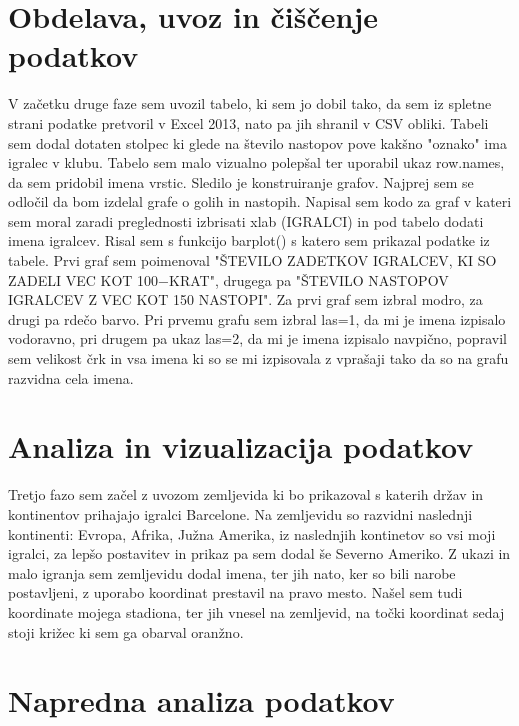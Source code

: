 \documentclass[11pt,a4paper]{article}
\begin{document}
\section{Obdelava, uvoz in čiščenje podatkov}
V začetku druge faze sem uvozil tabelo, ki sem jo dobil tako, da sem iz spletne strani podatke pretvoril v Excel 2013, nato pa jih shranil v CSV obliki. Tabeli sem dodal dotaten stolpec ki glede na število nastopov pove kakšno "oznako" ima igralec v klubu. Tabelo sem malo vizualno polepšal ter uporabil ukaz row.names, da sem pridobil imena vrstic. 
Sledilo je konstruiranje grafov. Najprej sem se odločil da bom izdelal grafe o golih in nastopih. Napisal sem kodo za graf v kateri sem moral zaradi preglednosti izbrisati xlab (IGRALCI) in pod tabelo dodati imena igralcev. Risal sem s funkcijo barplot() s katero sem prikazal podatke iz tabele. Prvi graf sem poimenoval "ŠTEVILO ZADETKOV IGRALCEV, KI SO ZADELI VEC KOT 100−KRAT", drugega pa "ŠTEVILO NASTOPOV IGRALCEV Z VEC KOT 150 NASTOPI". Za prvi graf sem izbral modro, za drugi pa rdečo barvo. Pri prvemu grafu sem izbral las=1, da mi je imena izpisalo vodoravno, pri drugem pa ukaz las=2, da mi je imena izpisalo navpično, popravil sem velikost črk in vsa imena ki so se mi izpisovala z vprašaji tako da so na grafu razvidna cela imena.

\section{Analiza in vizualizacija podatkov}
Tretjo fazo sem začel z uvozom zemljevida ki bo prikazoval s katerih držav in kontinentov prihajajo igralci Barcelone. Na zemljevidu so razvidni naslednji kontinenti: Evropa, Afrika, Južna Amerika, iz naslednjih kontinetov so vsi moji igralci, za lepšo postavitev in prikaz pa sem dodal še Severno Ameriko. Z ukazi in malo igranja sem zemljevidu dodal imena, ter jih nato, ker so bili narobe postavljeni, z uporabo koordinat prestavil na pravo mesto. Našel sem tudi koordinate mojega stadiona, ter jih vnesel na zemljevid, na točki koordinat sedaj stoji križec ki sem ga obarval oranžno.


\section{Napredna analiza podatkov}
\end{document}
